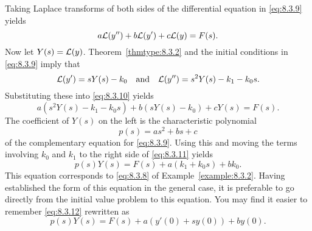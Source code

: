 \documentclass{ximera}
\begin{document}
Taking Laplace transforms of both sides of  the differential
equation in \eqref{eq:8.3.9} yields
\begin{equation}\label{eq:8.3.10}
a{\cal L}(y'')+b{\cal L}(y')+c{\cal L}(y)=F(s).
\end{equation}
Now let $Y(s)={\cal L}(y)$.  Theorem~\ref{thmtype:8.3.2} and the
initial conditions in \eqref{eq:8.3.9} imply that
$$
{\cal L}(y')=sY(s)-k_0\quad\mbox{and}\quad {\cal L}(y'')=s^2Y(s)-k_1-k_0s.
$$
Substituting these  into  \eqref{eq:8.3.10} yields
\begin{equation}\label{eq:8.3.11}
a\left(s^2Y(s)-k_1-k_0s\right)+b\left(sY(s)-k_0\right)+cY(s)=F(s).
\end{equation}
The coefficient of $Y(s)$ on the left is the characteristic
polynomial
$$
p(s)=as^2+bs+c
$$
of the complementary equation for \eqref{eq:8.3.9}. Using this and moving
the terms involving $k_0$ and $k_1$ to the right side of \eqref{eq:8.3.11}
yields
\begin{equation}\label{eq:8.3.12}
p(s)Y(s)=F(s)+a(k_1+k_0s)+bk_0.
\end{equation}
This equation corresponds to \eqref{eq:8.3.8} of Example~\ref{example:8.3.2}.
Having established the form of this equation in the general case, it
is preferable to go directly from the initial value problem to this
equation. You may find it easier to remember \eqref{eq:8.3.12} rewritten
as
\begin{equation} \label{eq:8.3.13}
p(s)Y(s)=F(s)+a\left(y'(0)+sy(0)\right)+by(0).
\end{equation}
\end{document}
